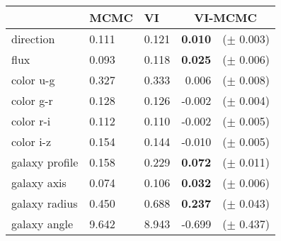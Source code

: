 \begin{tabular}{l|ll|rl}
\toprule
{} &   MCMC &     VI &                \multicolumn{2}{|c}{VI-MCMC} \\
\midrule
direction   &  0.111 &  0.121 &   \textbf{0.010} & \hspace{-1em}($\pm$ 0.003) \\
flux &  0.093 &  0.118 &   \textbf{0.025} & \hspace{-1em}($\pm$ 0.006) \\
color u-g  &  0.327 &  0.333 &   0.006          & \hspace{-1em}($\pm$ 0.008) \\
color g-r  &  0.128 &  0.126 &  -0.002          & \hspace{-1em}($\pm$ 0.004) \\
color r-i  &  0.112 &  0.110 &  -0.002          & \hspace{-1em}($\pm$ 0.005) \\
color i-z  &  0.154 &  0.144 &  -0.010          & \hspace{-1em}($\pm$ 0.005) \\
galaxy profile &  0.158 &  0.229 & \textbf{0.072} & \hspace{-1em}($\pm$ 0.011) \\
galaxy axis    &  0.074 &  0.106 & \textbf{0.032} & \hspace{-1em}($\pm$ 0.006) \\
galaxy radius  &  0.450 &  0.688 & \textbf{0.237} & \hspace{-1em}($\pm$ 0.043) \\
galaxy angle   &  9.642 &  8.943 & -0.699         & \hspace{-1em}($\pm$ 0.437) \\
\bottomrule
\end{tabular}
